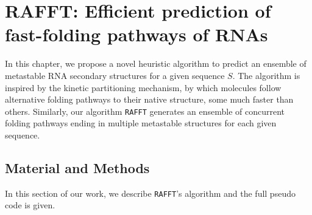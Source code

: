 \chapter{RAFFT: Efficient prediction of fast-folding pathways of RNAs}\label{ch:rafft}

In this chapter, we propose a novel heuristic algorithm to predict an ensemble of metastable RNA secondary structures for a given sequence $S$. The algorithm is inspired by the kinetic partitioning mechanism, by which molecules follow alternative folding pathways to their native structure, some much faster than others. Similarly, our algorithm \texttt{RAFFT} generates an ensemble of concurrent folding pathways ending in multiple metastable structures for each given sequence. 

\section{Material and Methods}
In this section of our work, we describe \texttt{RAFFT}'s algorithm and the full pseudo code is given.
